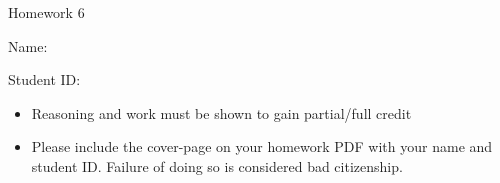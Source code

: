 \documentclass[11pt]{exam}
\begin{document}
\centerline{\Large \sc Homework 6}
\pagestyle{empty}

\hrulefill

\vspace{2cm}


{\Large \sc Name:}



\vspace{2cm}



{\Large \sc Student ID:}

\vspace{6cm}

\begin{itemize}
  \item Reasoning and work must be shown to gain partial/full
  credit
  \item Please include the cover-page on your homework PDF with your name and student ID. Failure of doing so is considered bad citizenship. 

 \end{itemize}
\end{document}
